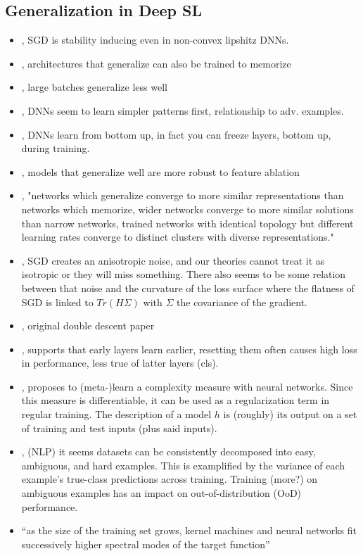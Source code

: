 \subsection{Generalization in Deep SL}
\begin{itemize}
    \item \citet{hardt2016train}, SGD is stability inducing even in non-convex lipshitz DNNs.
    \item \citet{zhang2016understanding}, architectures that generalize can also be trained to memorize
    \item \citet{keskar2016large}, large batches generalize less well
    \item \citet{arpit2017closer}, DNNs seem to learn simpler patterns first, relationship to adv. examples.
    \item \citet{raghu2017svcca}, DNNs learn from bottom up, in fact you can freeze layers, bottom up, during training.
    \item \citet{morcos2018importance}, models that generalize well are more robust to feature ablation
    \item \citet{morcos2018insights}, "networks which generalize converge to more similar representations than networks which memorize, wider networks converge to more similar solutions than narrow networks, trained networks with identical topology but different learning rates converge to distinct clusters with diverse representations."
    \item \citet{zhu2018anisotropic}, SGD creates an anisotropic noise, and our theories cannot treat it as isotropic or they will miss something. There also seems to be some relation between that noise and the curvature of the loss surface where the flatness of SGD is linked to $Tr(H \Sigma)$ with $\Sigma$ the covariance of the gradient.
    \item \citet{belkin2018reconciling}, original double descent paper
    \item \citet{zhang2019layers}, supports that early layers learn earlier, resetting them often causes high loss in performance, less true of latter layers (cls).
    \item \citet{lee2020neural}, proposes to (meta-)learn a complexity measure with neural networks. Since this measure is differentiable, it can be used as a regularization term in regular training. The description of a model $h$ is (roughly) its output on a set of training and test inputs (plus said inputs).
    \item \citet{swayamdipta2020dataset}, (NLP) it seems datasets can be consistently decomposed into easy, ambiguous, and hard examples. This is examplified by the variance of each example's true-class predictions across training. Training (more?) on ambiguous examples has an impact on out-of-distribution (OoD) performance.
    \item \citet{bordelon2020spectrum} ``as the size of the training set grows, kernel machines and neural networks fit successively higher spectral modes of the target function''
\end{itemize}

